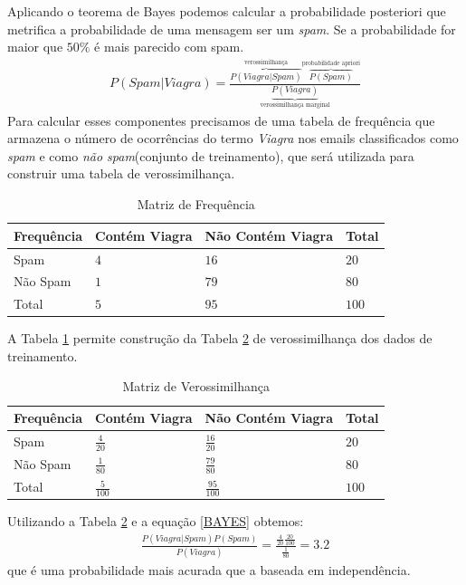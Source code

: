 Aplicando o teorema de Bayes podemos calcular a probabilidade posteriori que metrifica a probabilidade de uma mensagem ser um \emph{spam}. Se a probabilidade for maior que \(50\%\) é mais parecido com spam.
\begin{align}
P(Spam|Viagra) =  \frac{\overbrace{P(Viagra|Spam)}^{\text{verossimilhança}} \overbrace{P(Spam)}^{\text{probabilidade apriori}}}{\underbrace{P(Viagra)}_{\text{verossimilhança marginal}}}
\end{align}
Para calcular esses componentes precisamos de uma tabela de frequência que armazena o número de ocorrências do termo \emph{Viagra} nos emails classificados como \emph{spam} e como \emph{não spam}(conjunto de treinamento), que será utilizada para construir uma tabela de verossimilhança.
\begin{table}[htbp]
	\centering
	\caption{Matriz de Frequência}
		\begin{tabular}{llll} \hline

		Frequência	& Contém Viagra	& Não Contém Viagra	& Total   \\ \hline
		Spam		& \(4\) 		& \(16\)			& \(20\)  \\ 
		Não Spam	& \(1\) 		& \(79\)			& \(80\)  \\ 
		Total		& \(5\) 		& \(95\)			& \(100\) \\ \hline
		
		\end{tabular}
	\label{tab:ExemploDeTabela1}
	\vspace{0.1cm}
\end{table}
A Tabela \ref{tab:ExemploDeTabela1} permite construção da Tabela \ref{tab:ExemploDeTabela2} de verossimilhança dos dados de treinamento.
\bgroup
\def\arraystretch{1.5}
\begin{table}[htbp]
	\centering
	\caption{Matriz de Verossimilhança}
		\begin{tabular}{llll} \hline

		Frequência	& Contém Viagra		& Não Contém Viagra	& Total   \\ \hline
		Spam		& \(\frac{4}{20}\) 	& \(\frac{16}{20}\)	& \(20\)  \\ 
		Não Spam	& \(\frac{1}{80}\) 	& \(\frac{79}{80}\)	& \(80\)  \\ 
		Total		& \(\frac{5}{100}\) & \(\frac{95}{100}\)& \(100\) \\ \hline
		
		\end{tabular}
	\label{tab:ExemploDeTabela2}
	\vspace{0.1cm}
\end{table}
\egroup
Utilizando a Tabela \ref{tab:ExemploDeTabela2} e a equação \eqref{BAYES} obtemos:
\begin{align}
\frac{P(Viagra|Spam)P(Spam)}{P(Viagra)} = \frac{\frac{4}{20} \frac{20}{100}}{\frac{1}{80}} = 3.2
\end{align}
que é uma probabilidade mais acurada que a baseada em independência.

